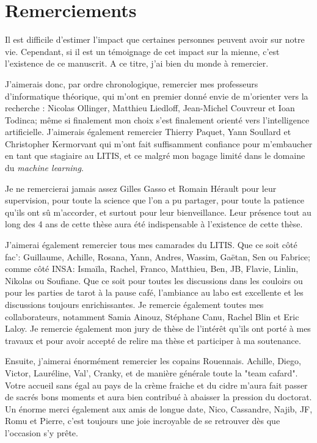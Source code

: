 \chapter*{Remerciements}
\label{chap:remerciements}

Il est difficile d'estimer l'impact que certaines personnes peuvent avoir sur notre vie. Cependant, si il est un témoignage de cet impact sur la mienne, c'est l'existence de ce manuscrit. A ce titre, j'ai bien du monde à remercier.

J'aimerais donc, par ordre chronologique, remercier mes professeurs d'informatique théorique, qui m'ont en premier donné envie de m'orienter vers la recherche : Nicolas Ollinger, Matthieu Liedloff, Jean-Michel Couvreur et Ioan Todinca; même si finalement mon choix s'est finalement orienté vers l'intelligence artificielle. J'aimerais également remercier Thierry Paquet, Yann Soullard et Christopher Kermorvant qui m'ont fait suffisamment confiance pour m'embaucher en tant que stagiaire au LITIS, et ce malgré mon bagage limité dans le domaine du \textit{machine learning}.

Je ne remercierai jamais assez Gilles Gasso et Romain Hérault pour leur supervision, pour toute la science que l'on a pu partager, pour toute la patience qu'ils ont sû m'accorder, et surtout pour leur bienveillance. Leur présence tout au long des 4 ans de cette thèse aura été indispensable à l'existence de cette thèse.

J'aimerai également remercier tous mes camarades du LITIS. Que ce soit côté fac': Guillaume, Achille, Rosana, Yann, Andres, Wassim, Gaëtan, Sen ou Fabrice; comme côté INSA: Ismaïla, Rachel,  Franco, Matthieu, Ben, JB, Flavie, Linlin, Nikolas ou Soufiane. Que ce soit pour toutes les discussions dans les couloirs ou pour les parties de tarot à la pause café, l'ambiance au labo est excellente et les discussions toujours enrichissantes. Je remercie également toutes mes collaborateurs, notamment Samia Ainouz, Stéphane Canu, Rachel Blin et Eric Laloy. Je remercie également mon jury de thèse de l'intérêt qu'ils ont porté à mes travaux et pour avoir accepté de relire ma thèse et participer à ma soutenance.

Ensuite, j'aimerai énormément remercier les copains Rouennais. Achille, Diego, Victor, Lauréline, Val', Cranky, et de manière générale toute la "team cafard". Votre accueil sans égal au pays de la crème fraiche et du cidre m'aura fait passer de sacrés bons moments et aura bien contribué à abaisser la pression du doctorat.  Un énorme merci également aux amis de longue date, Nico, Cassandre, Najib, JF, Romu et Pierre, c'est toujours une joie incroyable de se retrouver dès que l'occasion s'y prête.

